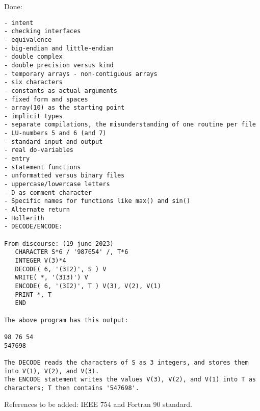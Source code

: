 \documentclass{article}
\begin{document}
Done:
\begin{verbatim}
- intent
- checking interfaces
- equivalence
- big-endian and little-endian
- double complex
- double precision versus kind
- temporary arrays - non-contiguous arrays
- six characters
- constants as actual arguments
- fixed form and spaces
- array(10) as the starting point
- implicit types
- separate compilations, the misunderstanding of one routine per file
- LU-numbers 5 and 6 (and 7)
- standard input and output
- real do-variables
- entry
- statement functions
- unformatted versus binary files
- uppercase/lowercase letters
- D as comment character
- Specific names for functions like max() and sin()
- Alternate return
- Hollerith
- DECODE/ENCODE:

From discourse: (19 june 2023)
   CHARACTER S*6 / '987654' /, T*6
   INTEGER V(3)*4
   DECODE( 6, '(3I2)', S ) V
   WRITE( *, '(3I3)') V
   ENCODE( 6, '(3I2)', T ) V(3), V(2), V(1)
   PRINT *, T
   END

The above program has this output:

98 76 54
547698

The DECODE reads the characters of S as 3 integers, and stores them into V(1), V(2), and V(3).
The ENCODE statement writes the values V(3), V(2), and V(1) into T as characters; T then contains '547698'.

\end{verbatim}


References to be added: IEEE 754 and Fortran 90 standard.
\end{document}
